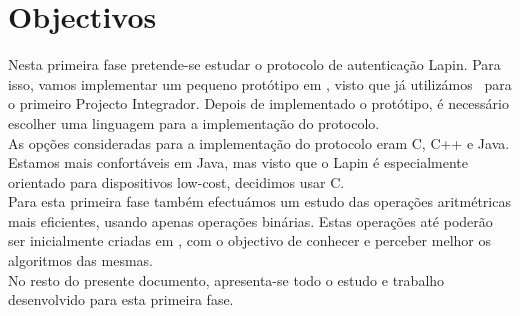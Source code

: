 \section{Objectivos}
Nesta primeira fase pretende-se estudar o protocolo de autenticação Lapin. Para isso, vamos implementar um pequeno protótipo em \sage, visto que já utilizámos \sage\ para o primeiro Projecto Integrador. Depois de implementado o protótipo, é necessário escolher uma linguagem para a implementação do protocolo.\\
As opções consideradas para a implementação do protocolo eram \textsf{C}, \textsf{C++} e \textsf{Java}. Estamos mais confortáveis em \textsf{Java}, mas visto que o Lapin é especialmente orientado para dispositivos \textsf{low-cost}, decidimos usar \textsf{C}.\\
Para esta primeira fase também efectuámos um estudo das operações aritmétricas mais eficientes, usando apenas operações binárias. Estas operações até poderão ser inicialmente criadas em \sage, com o objectivo de conhecer e perceber melhor os algoritmos das mesmas.\\
No resto do presente documento, apresenta-se todo o estudo e trabalho desenvolvido para esta primeira fase. 